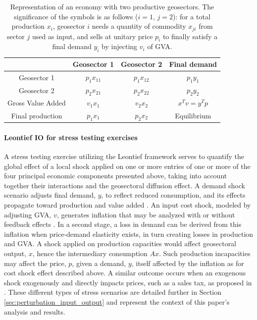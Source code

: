 \documentclass{article}
\begin{document}
\begin{table}[!h]
    \centering
    \setlength\extrarowheight{-1pt}
    \begin{tabular}{|c|c|c|c|}
    \hline
        & Geosector 1      & Geosector 2      & Final demand \\
    \hline
    Geosector 1    & $p_1 x_{11}$ &  $p_1 x_{12}$ &   $p_1 y_1$ \\
    Geosector 2    & $p_2 x_{21}$ &  $p_2 x_{22}$ &   $p_2 y_2$ \\
    \hline
    Gross Value Added     & $v_1 x_1$ &  $v_2 x_2$ & $x^T v=y^T p$ \\
    \hline
    Final production    & $p_1 x_1$ & $p_2 x_2$ & Equilibrium \\
    \hline
    \end{tabular}
    
    \caption{Representation of an economy with two productive geosectors. The significance of the symbols is as follows ($i=1$, $j=2$): for a total production $x_i$, geosector $i$ needs a quantity of commodity $x_{ji}$ from sector $j$ used as input, and sells at unitary price $p_i$ to finally satisfy a final demand $y_i$ by injecting $v_i$ of GVA. }
    \label{tab:leontief_two_sectors}
\end{table}


\paragraph{Leontief IO for stress testing exercises} 
A stress testing exercise utilizing the Leontief framework serves to quantify the global effect of a local shock applied on one or more entries of one or more of the four principal economic components presented above, taking into account together their interactions and the geosectoral diffusion effect. A demand shock scenario adjusts final demand, $y$, to reflect reduced consumption, and its effects propagate toward production and value added \cite{siuda2022stress}. An input cost shock, modeled by adjusting GVA, $v$, generates inflation that may be analyzed with or without feedback effects \cite{ipsen2023stress}. In a second stage, a loss in demand can be derived from this inflation when price-demand elasticity exists, in turn creating losses in production and GVA. A shock applied on production capacities would affect geosectoral output, $x$, hence the intermediary consumption $Ax$. Such production incapacities may affect the price, $p$, given a demand, $y$, itself affected by the inflation as for cost shock effect described above. A similar outcome occurs when an exogenous shock exogenously and directly impacts prices, such as a sales tax, as proposed in \cite{cardenete2002price}. These different types of stress scenarios are detailed further in Section \ref{sec:perturbation_input_output} and represent the context of this paper's analysis and results. 
\end{document}

